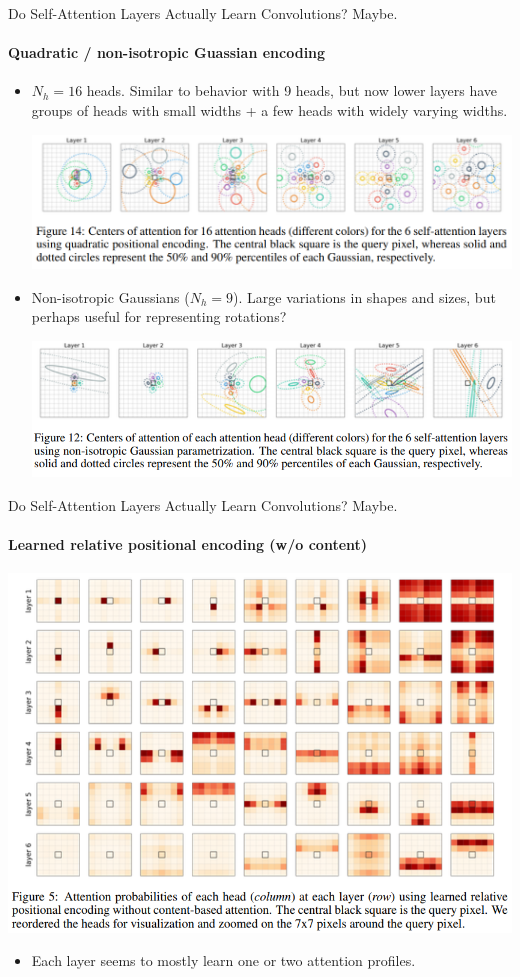 \documentclass[9pt]{beamer}
\begin{document}
\begin{frame}{Do Self-Attention Layers Actually Learn Convolutions? Maybe.}
\framesubtitle{Quadratic / non-isotropic Guassian encoding}
\begin{itemize}
\item $N_h=16$ heads. Similar to behavior with 9 heads, but now lower layers have groups of heads with small widths + a few heads with widely varying widths.
\begin{center}
    \includegraphics[width=.75\textwidth]{presentation/images/quad_emb_16.png}
\end{center}

\item Non-isotropic Gaussians ($N_h=9$). Large variations in shapes and sizes, but perhaps useful for representing rotations?
\begin{center}
    \includegraphics[width=.75\textwidth]{presentation/images/non_iso_gaussian.png}
\end{center}
\end{itemize}
\end{frame}


\begin{frame}{Do Self-Attention Layers Actually Learn Convolutions? Maybe.}
\framesubtitle{Learned relative positional encoding (w/o content)}
\begin{center}
    \includegraphics[width=.7\textwidth]{
        presentation/images/learned_rel_emb_nocontent.png}
    \vspace{-.1in}
\end{center}
\begin{itemize}
\item Each layer seems to mostly learn one or two attention profiles. 
\end{itemize}
\end{frame}
\end{document}

